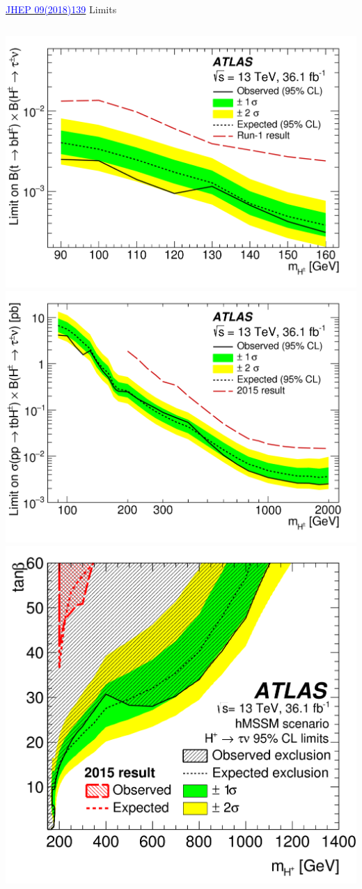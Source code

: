 \documentclass[aspectratio=169,xcolor=table]{beamer}
\begin{document}
    \begin{frame}{\href{https://link.springer.com/article/10.1007/JHEP09(2018)139}{\textcolor{blue}{JHEP 09(2018)139}} Limits}
      \begin{columns}
        \centering
        \includegraphics[width=.65\textwidth,keepaspectratio=true]{Limits/Combined_low_NoLabel_2018.png}
        \includegraphics[width=.65\textwidth,keepaspectratio=true]{Limits/Combined_CrossSection_2018.png}
        \centering
        \includegraphics[width=\textwidth,keepaspectratio=true]{Limits/tanB_Limit_2018.png}
      \end{columns}
    \end{frame}
\end{document}
